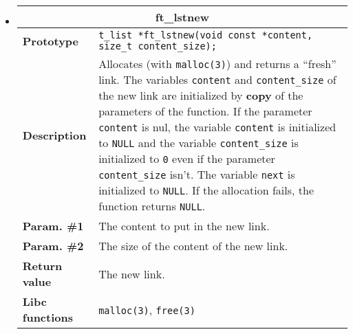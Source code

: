 \documentclass{42-en}
\begin{document}
    \begin{itemize}\itemsep1cm

            \item \begin{tabular}{|l|p{11cm}|}
                \hline
                \multicolumn{2}{|c|}{\textbf{ft\_lstnew}}\\
                \hline
                \textbf{Prototype} &
                \texttt{t\_list *\hspace{5mm}ft\_lstnew(void const
                  *content, size\_t content\_size);}\\
                \hline
                \textbf{Description} & Allocates (with
                \texttt{malloc(3)}) and returns a ``fresh'' link.
                The variables \texttt{content} and
                \texttt{content\_size} of the new link are
                initialized by \textbf{copy} of the parameters of
                the function. If the parameter \texttt{content} is
                nul, the variable \texttt{content} is initialized to
                \texttt{NULL} and the variable \texttt{content\_size}
                is initialized to \texttt{0} even if the parameter
                \texttt{content\_size} isn't. The variable
                \texttt{next} is initialized to \texttt{NULL}. If
                the allocation fails, the function returns
                \texttt{NULL}.\\
                \hline
                \textbf{Param. \#1} & The content to put in the new
                link.\\
                \hline
                \textbf{Param. \#2} & The size of the content of the
                new link.\\
                \hline
                \textbf{Return value} & The new link.\\
                \hline
                \textbf{Libc functions} & \texttt{malloc(3)},
                \texttt{free(3)}\\
                \hline
            \end{tabular}


\end{itemize}
\end{document}
